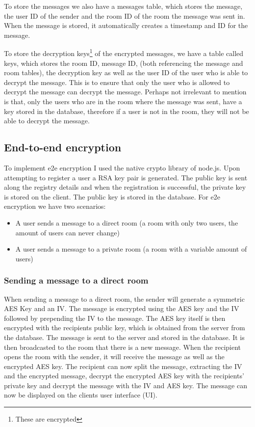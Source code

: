 \documentclass[a4paper]{article}
\begin{document}
To store the messages we also have a messages table, which stores the message, the user ID of the sender and the room ID of the room the message was sent in. When the message is stored, it automatically creates a timestamp and ID for the message.

To store the decryption keys\footnote{These are encrypted} of the encrypted messages, we have a table called keys, which stores the room ID, message ID, (both referencing the message and room tables), the decryption key as well as the user ID of the user who is able to decrypt the message. This is to ensure that only the user who is allowed to decrypt the message can decrypt the message. Perhaps not irrelevant to mention is that, only the users who are in the room where the message was sent, have a key stored in the database, therefore if a user is not in the room, they will not be able to decrypt the message.

\subsection{End-to-end encryption}
To implement e2e encryption I used the native crypto library of node.js. Upon attempting to register a user a RSA key pair is generated. The public key is sent along the registry details and when the registration is successful, the private key is stored on the client. The public key is stored in the database.
For e2e encryption we have two scenarios:
\begin{itemize}
    \item A user sends a message to a direct room (a room with only two users, the amount of users can never change)
    \item A user sends a message to a private room (a room with a variable amount of users)
\end{itemize}
\subsubsection{Sending a message to a direct room}
When sending a message to a direct room, the sender will generate a symmetric AES Key and an IV. The message is encrypted using the AES key and the IV followed by prepending the IV to the message. The AES key itself is then encrypted with the recipients public key, which is obtained from the server from the database. The message is sent to the server and stored in the database. It is then broadcasted to the room that there is a new message. When the recipient opens the room with the sender, it will receive the message as well as the encrypted AES key. The recipient can now split the message, extracting the IV and the encrypted message, decrypt the encrypted AES key with the recipients' private key and decrypt the message with the IV and AES key. The message can now be displayed on the clients user interface (UI).
\end{document}
